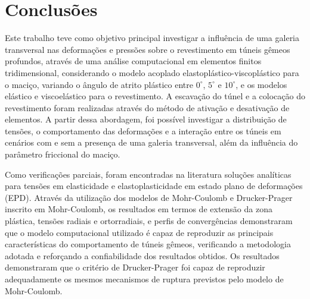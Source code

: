 %
%
%
%
\chapter{Conclusões}

Este trabalho teve como objetivo principal investigar a influência de uma galeria transversal nas deformações e pressões sobre o revestimento em túneis gêmeos profundos, através de uma análise computacional em elementos finitos tridimensional, considerando o modelo acoplado elastoplástico-viscoplástico para o maciço, variando o ângulo de atrito plástico entre $0^\circ$, $5^\circ$ e $10^\circ$, e os modelos elástico e viscoelástico para o revestimento. A escavação do túnel e a colocação do revestimento foram realizadas através do método de ativação e desativação de elementos. A partir dessa abordagem, foi possível investigar a distribuição de tensões, o comportamento das deformações e a interação entre os túneis em cenários com e sem a presença de uma galeria transversal, além da influência do parâmetro friccional do maciço.

Como verificações parciais, foram encontradas na literatura soluções analíticas para tensões em elasticidade e elastoplasticidade em estado plano de deformações (EPD). Através da utilização dos modelos de Mohr-Coulomb e Drucker-Prager inscrito em Mohr-Coulomb, os resultados em termos de extensão da zona plástica, tensões radiais e ortorradiais, e perfis de convergências demonstraram que o modelo computacional utilizado é capaz de reproduzir as principais características do comportamento de túneis gêmeos, verificando a metodologia adotada e reforçando a confiabilidade dos resultados obtidos. Os resultados demonstraram que o critério de Drucker-Prager foi capaz de reproduzir adequadamente os mesmos mecanismos de ruptura previstos pelo modelo de Mohr-Coulomb.

